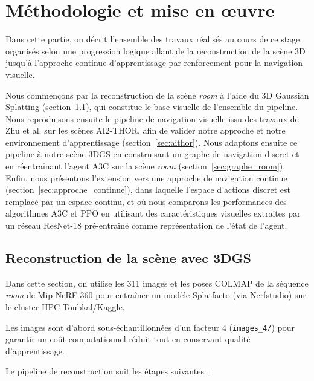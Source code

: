 
\section{Méthodologie et mise en œuvre}


Dans cette partie, on décrit l'ensemble des travaux réalisés au cours de ce stage, 
organisés selon une progression logique allant de la reconstruction de 
la scène 3D jusqu'à l'approche continue d'apprentissage par renforcement pour la navigation visuelle.

Nous commençons par la reconstruction de la scène \textit{room} à l'aide 
du 3D Gaussian Splatting (section~\ref{sec:reconstruction}), qui constitue 
le base visuelle de l'ensemble du pipeline. Nous reproduisons ensuite le 
pipeline de navigation visuelle issu des travaux de Zhu et al. \cite{ref10} sur les scènes AI2-THOR, afin de valider notre approche et notre environnement d'apprentissage (section~\ref{sec:aithor}). Nous adaptons ensuite ce pipeline à notre scène 3DGS en construisant un graphe de navigation discret et en réentraînant l'agent A3C sur la scène 
\textit{room} (section~\ref{sec:graphe_room}). Enfin, nous présentons l'extension vers une approche de navigation 
continue (section~\ref{sec:approche_continue}), dans laquelle l'espace 
d'actions discret est remplacé par un espace continu, et où nous 
comparons les performances des algorithmes A3C et PPO en utilisant 
des caractéristiques visuelles extraites par un réseau ResNet-18 
pré-entraîné comme représentation de l'état de l'agent.


\subsection{Reconstruction de la scène avec 3DGS}
\label{sec:reconstruction}



Dans cette section, on utilise les 311 images et les poses COLMAP de la 
séquence \textit{room} de Mip-NeRF 360 pour entraîner un modèle Splatfacto 
(via Nerfstudio) sur le cluster HPC Toubkal/Kaggle.

Les images sont d'abord sous-échantillonnées d'un facteur 4 
(\texttt{images\_4/}) pour garantir un  coût computationnel réduit tout en conservant qualité d'apprentissage.

Le pipeline de reconstruction suit les étapes suivantes :

